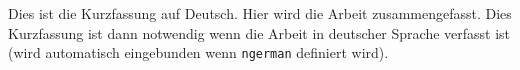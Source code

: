 Dies ist die Kurzfassung auf Deutsch. Hier wird die Arbeit zusammengefasst.
Dies Kurzfassung ist dann notwendig wenn die Arbeit in deutscher Sprache verfasst ist 
(wird automatisch eingebunden wenn \verb|ngerman| definiert wird).


